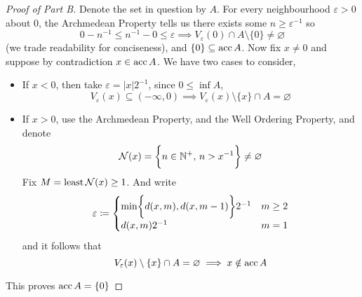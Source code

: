 \documentclass[../main.tex]{subfiles}
\begin{document}
\begin{proof}[Proof of Part B]
    Denote the set in question by $A$. For every neighbourhood $\varepsilon>0$ about $0$, the Archmedean Property tells us there exists some $n\geq \varepsilon^{-1}$ so
    \[0-n^{-1}\leq n^{-1}-0\leq \varepsilon\implies V_{\varepsilon}(0)\cap A\setminus\{0\}\neq\varnothing\]
    (we trade readability for conciseness), and $\{0\}\subseteq \operatorname{acc}{A}$. Now fix $x\neq 0$ and suppose by contradiction $x\in\operatorname{acc}{A}$. We have two cases to consider,
    \begin{itemize}
        \item If $x<0$, then take $\varepsilon = |x|2^{-1}$, since $0\leq \inf{A}$,
        \[
        V_\varepsilon(x)\subseteq(-\infty,0)\implies V_\varepsilon(x)\setminus\{x\}\cap A = \varnothing
        \]
        \item If $x>0$, use the Archmedean Property, and the Well Ordering Property, and denote
        \[\mathcal{N}(x)=\biggl\{n\in\mathbb{N}^+,\,n>x^{-1}\biggr\}\neq\varnothing\]
        Fix $M = \operatorname{least}\mathcal{N}(x)\geq 1$. And write
        \[\varepsilon\coloneqq\begin{cases}\min\biggl\{d(x,m),d(x,m-1)\biggr\}2^{-1}&m\geq 2\\
        d(x,m)2^{-1}&m=1
        \end{cases}\]
        and it follows that
        \[V_\varepsilon(x)\setminus\{x\}\cap A=\varnothing\implies x\notin \operatorname{acc}{A}\]
    \end{itemize}
    This proves $\operatorname{acc}{A}=\{0\}$
\end{proof}
\end{document}
